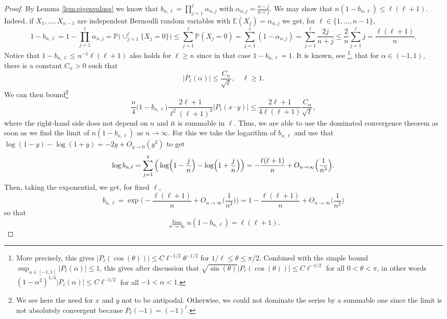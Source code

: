 \documentclass[10pt,reqno]{amsart}
\numberwithin{equation}{section}
\numberwithin{figure}{section}
\theoremstyle{plain}
\newcommand{\<}{\langle}
\renewcommand{\>}{\rangle}
\begin{document}
\begin{proof}
\noindent
  By Lemma \ref{lem:eigenvalues} we know that
  $b_{n,\ell} =  
  \prod_{j=1}^{\ell} \alpha_{n,j}$
  with 
  $\alpha_{n,j} =\frac{n-j}{n+j}$.
  We may show that
  $n(1-b_{n,\ell}) \leq \ell (\ell+1)$. Indeed,
  if $X_1,\dots,X_{n-1}$ are independent Bernoulli
  random variables with
  $\mathbb E(X_j) = \alpha_{n,j}$ we get, for
  $\ell \in \{1,\dots,n-1\}$,
  \[1-b_{n,\ell} = 1-\prod_{j=1}^\ell \alpha_{n,j}
  = \mathbb P\big(\cup_{j=1}^\ell \{X_j = 0\} \big)
  \leq 
  \sum_{j=1}^\ell \mathbb P(X_j = 0)
  = \sum_{j=1}^\ell (1-\alpha_{n,j})
  =\sum_{j=1}^\ell \frac{2j}{n+j}
  \leq \frac{2}{n} \sum_{j=1}^\ell j
  = \frac{\ell (\ell+1)}{n}.\]
  Notice that
  $1-b_{n,\ell} \leq n^{-1} \ell(\ell+1)$ also holds 
  for $\ell \geq n$ since
  in that case $1-b_{n,\ell}  = 1$.
    It is known, see 
    \cite[Th.~7.32.2 with $\alpha=\beta=0$]{zbMATH03477793}\footnote{More precisely, this gives $|P_\ell(\cos(\theta))|\leq C\ell^{-1/2}\theta^{-1/2}$ for $1/\ell\leq\theta\leq\pi/2$. Combined with the simple bound $\sup_{\alpha\in[-1,1]}|P_\ell(\alpha)|\leq1$, this gives after discussion that  $\sqrt{\sin(\theta)}|P_\ell(\cos(\theta))|\leq C\ell^{-1/2}$ for all $0<\theta<\pi$, in other words $(1-\alpha^2)^{1/4}|P_\ell(\alpha)|\leq C\ell^{-1/2}$ for all $-1<\alpha<1$.}, that
    for $\alpha \in (-1,1)$, there is a constant
    $C_\alpha > 0$ such that
  \begin{equation}\label{eq:legendre-bound}
    |P_\ell(\alpha)|\leq\frac{C_\alpha}{\sqrt{\ell}},\quad \ell\geq 1.
  \end{equation}
  We can then bound\footnote{We see here the need
  for $x$ and $y$ not to be antipodal. Otherwise, we could not dominate the series
  by a summable one
  since the limit is not absolutely convergent
  because $P_\ell(-1) = (-1)^\ell$.}
  \begin{equation}
    \frac{n}{4} \big(1-b_{n,\ell}\big)
    \frac{2\ell+1}{\ell^2(\ell+1)^2}|P_\ell(x\cdot y)|
    \leq  \frac{2\ell + 1}{4\ell (\ell+1)} \frac{C_\alpha}{\sqrt \ell}, 
  \end{equation}
  where the right-hand side does not depend on $n$ and it is summable in $\ell$. 
  Thus, we are able to use the dominated convergence theorem as soon as we find the limit
  of $n(1-b_{n,\ell})$ as $n \to \infty$.
  For this we take the logarithm of $b_{n,\ell}$ and use that $\log(1-y)-\log(1+y)=-2y+O_{y\to0}(y^3)$ to get
  \begin{equation}
    \log b_{n,\ell}
    = \sum_{j=1}^\ell\Big(\log\Bigl(1-\frac{j}{n}\Bigr)-\log\Bigl(1+\frac{j}{n}\Bigr)\Big)
    = -\frac{\ell(\ell+1)}{n}+O_{n\to\infty}\Big(\frac{1}{n^3}\Big).
  \end{equation}
    Then, taking the exponential, we get, for fixed $\ell$,
    \begin{equation}
    b_{n,\ell} = 
    \exp\bigg(
    -\frac{\ell(\ell+1)}{n}+O_{n\to\infty}\Big(\frac{1}{n^3}\Big)
    \bigg)
    =1 - \frac{\ell(\ell+1)}{n} +
    O_{n\to\infty}\Big(\frac{1}{n^2}\Big)
    \end{equation}
    so that
    \[\lim_{n \to \infty} n(1-b_{n,\ell}) = 
    \ell(\ell+1).\]




\end{proof}
\end{document}
